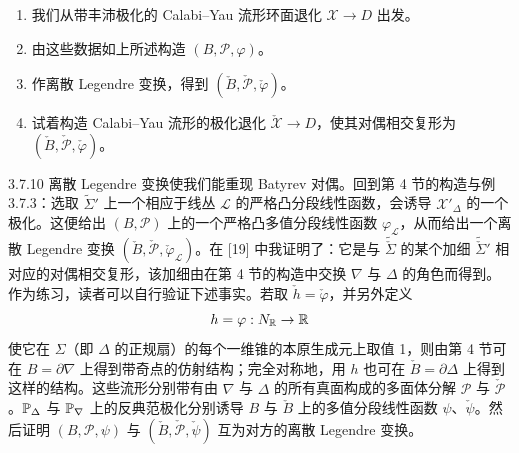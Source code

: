 \begin{enumerate}[label=(\arabic*)]
\item 我们从带丰沛极化的 Calabi--Yau 流形环面退化 $\mathcal X\to D$ 出发。
\item 由这些数据如上所述构造 $(B,\mathcal P,\varphi)$。
\item 作离散 Legendre 变换，得到 $(\check B,\check{\mathcal P},\check\varphi)$。
\item 试着构造 Calabi--Yau 流形的极化退化 $\check{\mathcal X}\to D$，使其对偶相交复形为 $(\check B,\check{\mathcal P},\check\varphi)$。
\end{enumerate}

\begin{example}{3.7.10}
离散 Legendre 变换使我们能重现 Batyrev 对偶。回到第 4 节的构造与例 3.7.3：选取 $\tilde\Sigma'$ 上一个相应于线丛 $\mathcal L$ 的严格凸分段线性函数，会诱导 $\mathcal X'_\Delta$ 的一个极化。这便给出 $(B,\mathcal P)$ 上的一个严格凸多值分段线性函数 $\varphi_{\mathcal L}$，从而给出一个离散 Legendre 变换 $(\check B,\check{\mathcal P},\check\varphi_{\mathcal L})$。在 [19] 中我证明了：它是与 $\tilde{\check\Sigma}$ 的某个加细 $\tilde{\check\Sigma}'$ 相对应的对偶相交复形，该加细由在第 4 节的构造中交换 $\nabla$ 与 $\Delta$ 的角色而得到。
作为练习，读者可以自行验证下述事实。若取 $\check h=\check\varphi$，并另外定义
\[
h=\varphi:N_{\mathbb{R}}\to\mathbb{R}
\]
使它在 $\Sigma$（即 $\Delta$ 的正规扇）的每个一维锥的本原生成元上取值 1，则由第 4 节可在 $B=\partial\nabla$ 上得到带奇点的仿射结构；完全对称地，用 $h$ 也可在 $\check B=\partial\Delta$ 上得到这样的结构。这些流形分别带有由 $\nabla$ 与 $\Delta$ 的所有真面构成的多面体分解 $\mathcal P$ 与 $\check{\mathcal P}$。$\mathbb{P}_\Delta$ 与 $\mathbb{P}_\nabla$ 上的反典范极化分别诱导 $B$ 与 $\check B$ 上的多值分段线性函数 $\psi$、$\check\psi$。然后证明 $(B,\mathcal P,\psi)$ 与 $(\check B,\check{\mathcal P},\check\psi)$ 互为对方的离散 Legendre 变换。
\end{example}

